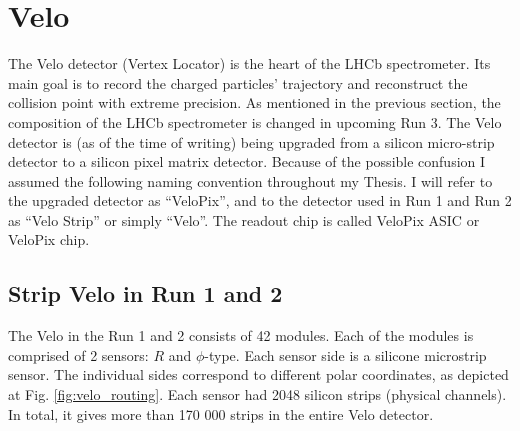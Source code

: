 \section{Velo}

The Velo detector (Vertex Locator) is the heart of the LHCb spectrometer.
Its main goal is to record the charged particles' trajectory and reconstruct the collision point with extreme precision. As mentioned in the previous section, the composition of the LHCb spectrometer is changed in upcoming Run 3. The Velo detector is (as of the time of writing) being upgraded from a silicon micro-strip detector to a silicon pixel matrix detector. Because of the possible confusion I assumed the following naming convention throughout my Thesis. I will refer to the upgraded detector as ``VeloPix'', and to the detector used in Run 1 and Run 2 as  ``Velo Strip'' or simply ``Velo''. The readout chip is called VeloPix ASIC or VeloPix chip.

\subsection{Strip Velo in Run 1 and 2}

The Velo in the Run 1 and 2 consists of 42 modules.
Each of the modules is comprised of 2 sensors: $R$ and $\phi$-type.
Each sensor side is a silicone microstrip sensor.
The individual sides correspond to different polar coordinates, as depicted at Fig. \ref{fig:velo_routing}.
Each sensor had 2048 silicon strips (physical channels).
In total, it gives more than 170 000 strips in the entire Velo detector.


